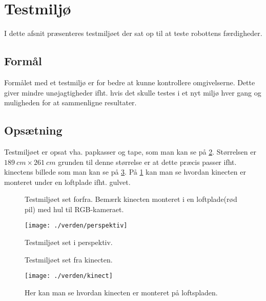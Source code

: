 \section{Testmiljø}
I dette afsnit præsenteres testmiljøet der sat op til at teste robottens færdigheder.

\subsection{Formål}
Formålet med et testmiljø er for bedre at kunne kontrollere omgivelserne.
Dette giver mindre unøjagtigheder ifht. hvis det skulle testes i et nyt miljø hver gang og muligheden for at sammenligne resultater.

\subsection{Opsætning}\label{testmiljo:opsaetning}
Testmiljøet er opsat vha. papkasser og tape, som man kan se på \cref{testmiljo:perspektiv}.
Størrelsen er $189 \ cm \times 261 \ cm$ grunden til denne størrelse er at dette præcis passer ifht. kinectens billede som man kan se på \cref{testmiljo:oppefra}.
På \cref{testmiljo:forfra} kan man se hvordan kinecten er monteret under en loftplade ifht. gulvet.

\begin{figure}
\caption{Testmiljøet set forfra. Bemærk kinecten monteret i en loftplade(rød pil) med hul til RGB-kameraet.}
\label{testmiljo:forfra}
\end{figure}

\begin{figure}
\texttt{[image: ./verden/perspektiv]}
\caption{Testmiljøet set i perspektiv.}
\label{testmiljo:perspektiv}
\end{figure}

\begin{figure}
\caption{Testmiljøet set fra kinecten.}
\label{testmiljo:oppefra}
\end{figure}

\begin{figure}
\texttt{[image: ./verden/kinect]}
\caption{Her kan man se hvordan kinecten er monteret på loftspladen.}
\label{testmiljo:kinect}
\end{figure}